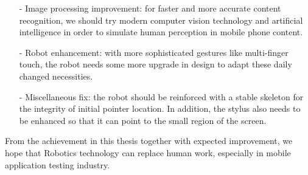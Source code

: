	\begin{itemize}
		\item[-] Image processing improvement: for faster and more accurate content recognition, we should try modern computer vision technology and artificial intelligence in order to simulate human perception in mobile phone content. 
		\item[-] Robot enhancement: with more sophisticated gestures like multi-finger touch, the robot needs some more upgrade in design to adapt these daily changed necessities.
		\item[-] Miscellaneous fix: the robot should be reinforced with a stable skeleton for the integrity of initial pointer location. In addition, the stylus also needs to be enhanced so that it can point to the small region of the screen.
	\end{itemize}

From the achievement in this thesis together with expected improvement, we hope that Robotics technology can replace human work, especially in mobile application testing industry.